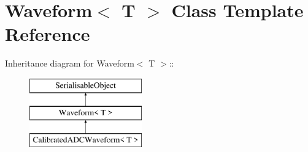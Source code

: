 \hypertarget{classWaveform}{
\section{Waveform$<$ T $>$ Class Template Reference}
\label{classWaveform}
}
Inheritance diagram for Waveform$<$ T $>$::\begin{figure}[H]
\begin{center}
\leavevmode
\includegraphics[height=3cm]{classWaveform}
\end{center}
\end{figure}
